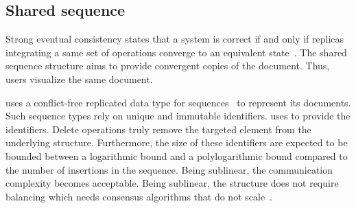 

\subsection{Shared sequence}

Strong eventual consistency states that a system is correct if and only if
replicas integrating a same set of operations converge to an equivalent
state~\cite{shapiro2011comprehensive}. The shared sequence structure aims to
provide convergent copies of the document. Thus, users visualize the same
document.

\CRATE uses a conflict-free replicated data type for
sequences~\cite{shapiro2011conflict} to represent its documents. Such sequence
types rely on unique and immutable identifiers. \CRATE uses \LSEQ to provide the
identifiers. Delete operations truly remove the targeted element from the
underlying structure. Furthermore, the size of these identifiers are expected to
be bounded between a logarithmic bound and a polylogarithmic bound compared to
the number of insertions in the sequence. Being sublinear, the communication
complexity becomes acceptable. Being sublinear, the structure does not require
balancing which needs consensus algorithms that do not
scale~\cite{mostefaoui2015signature}.


